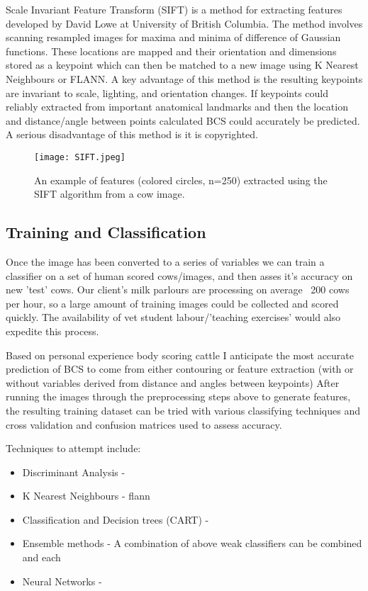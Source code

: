 \documentclass[11pt]{article}
\begin{document}
	
	Scale Invariant Feature Transform (SIFT) is a method for extracting features developed by David Lowe at University of British Columbia\cite{Lowe2004a}.
	The method involves scanning resampled images for maxima and minima of difference of Gaussian functions.
	These locations are mapped and their orientation and dimensions stored as a keypoint which can then be matched to a new image using K Nearest Neighbours or FLANN. 
	A key advantage of this method is the resulting keypoints are invariant to scale, lighting, and orientation changes.
	If keypoints could reliably extracted from important anatomical landmarks and then the location and distance/angle between points calculated BCS could accurately be predicted.
	A serious disadvantage of this method is it is copyrighted.

	\begin{figure}[b!]
		\centering
		\texttt{[image: SIFT.jpeg]}
		\caption{An example of features (colored circles, n=250) extracted  using the SIFT algorithm from a cow image.}
	\end{figure}


\subsection{Training and Classification}
	Once the image has been converted to a series of variables we can train a classifier on a set of human scored cows/images, and then asses it's accuracy on new 'test' cows.
	Our client's milk parlours are processing on average ~200 cows per hour, so a large amount of training images could be collected and scored quickly. 
	The availability of vet student labour/'teaching exercises' would also expedite this process.


	Based on personal experience body scoring cattle I anticipate the most accurate prediction of BCS to come from either contouring or feature extraction (with or without variables derived from distance and angles between keypoints)
	After running the images through the preprocessing steps above to generate features, the resulting training dataset can be tried with various classifying techniques and cross validation and confusion matrices used to assess accuracy.


	Techniques to attempt include: 

	\begin{itemize}
		\item Discriminant Analysis - 
		\item K Nearest Neighbours - flann
		\item Classification and Decision trees (CART) - 
		\item Ensemble methods - A combination of above weak classifiers can be combined and each 
		\item Neural Networks - 
	\end{itemize}
\end{document}
